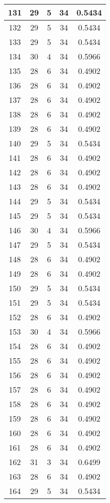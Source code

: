 \documentclass[letterpaper, 12pt]{article}
\begin{document}
\begin{longtable}{|c|c|c|c|c|}
\hline
131 & 29 & 5 & 34 & 0.5434 \\
\hline
132 & 29 & 5 & 34 & 0.5434 \\
\hline
133 & 29 & 5 & 34 & 0.5434 \\
\hline
134 & 30 & 4 & 34 & 0.5966 \\
\hline
135 & 28 & 6 & 34 & 0.4902 \\
\hline
136 & 28 & 6 & 34 & 0.4902 \\
\hline
137 & 28 & 6 & 34 & 0.4902 \\
\hline
138 & 28 & 6 & 34 & 0.4902 \\
\hline
139 & 28 & 6 & 34 & 0.4902 \\
\hline
140 & 29 & 5 & 34 & 0.5434 \\
\hline
141 & 28 & 6 & 34 & 0.4902 \\
\hline
142 & 28 & 6 & 34 & 0.4902 \\
\hline
143 & 28 & 6 & 34 & 0.4902 \\
\hline
144 & 29 & 5 & 34 & 0.5434 \\
\hline
145 & 29 & 5 & 34 & 0.5434 \\
\hline
146 & 30 & 4 & 34 & 0.5966 \\
\hline
147 & 29 & 5 & 34 & 0.5434 \\
\hline
148 & 28 & 6 & 34 & 0.4902 \\
\hline
149 & 28 & 6 & 34 & 0.4902 \\
\hline
150 & 29 & 5 & 34 & 0.5434 \\
\hline
151 & 29 & 5 & 34 & 0.5434 \\
\hline
152 & 28 & 6 & 34 & 0.4902 \\
\hline
153 & 30 & 4 & 34 & 0.5966 \\
\hline
154 & 28 & 6 & 34 & 0.4902 \\
\hline
155 & 28 & 6 & 34 & 0.4902 \\
\hline
156 & 28 & 6 & 34 & 0.4902 \\
\hline
157 & 28 & 6 & 34 & 0.4902 \\
\hline
158 & 28 & 6 & 34 & 0.4902 \\
\hline
159 & 28 & 6 & 34 & 0.4902 \\
\hline
160 & 28 & 6 & 34 & 0.4902 \\
\hline
161 & 28 & 6 & 34 & 0.4902 \\
\hline
162 & 31 & 3 & 34 & 0.6499 \\
\hline
163 & 28 & 6 & 34 & 0.4902 \\
\hline
164 & 29 & 5 & 34 & 0.5434 \\

\end{longtable}
\end{document}
